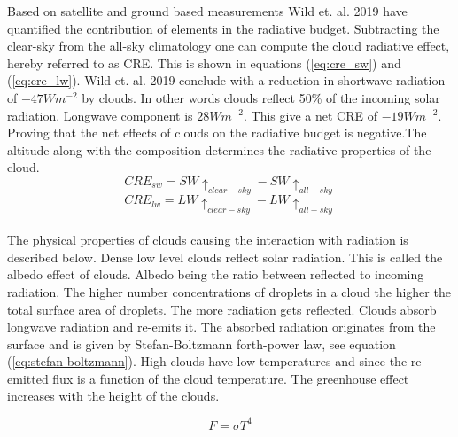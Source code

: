 Based on satellite and ground based measurements Wild et. al. 2019 have quantified the contribution of elements in the radiative budget. Subtracting the clear-sky from the all-sky climatology one can compute the cloud radiative effect, hereby referred to as CRE. This is shown in equations (\ref{eq:cre_sw}) and (\ref{eq:cre_lw}). Wild et. al. 2019 conclude with a reduction in shortwave radiation of $-47Wm^{-2}$ by clouds. In other words clouds reflect 50\% of the incoming solar radiation. Longwave component is $28Wm^{-2}$. This give a net CRE of $-19Wm^{-2}$. Proving that the net effects of clouds on the radiative budget is negative.The altitude along with the composition determines the radiative properties of the cloud.
\begin{equation} \label{eq:cre_sw}
    CRE_{sw} = SW\uparrow_{clear-sky} - SW\uparrow_{all-sky}
\end{equation}
\begin{equation} \label{eq:cre_lw}
    CRE_{lw} = LW\uparrow_{clear-sky} - LW\uparrow_{all-sky}
\end{equation}
\\
The physical properties of clouds causing the interaction with radiation is described below. Dense low level clouds reflect solar radiation. This is called the albedo effect of clouds. Albedo being the ratio between reflected to incoming radiation. The higher number concentrations of droplets in a cloud the higher the total surface area of droplets. The more radiation gets reflected. Clouds absorb longwave radiation and re-emits it. The absorbed radiation originates from the surface and is given by Stefan-Boltzmann forth-power law, see equation (\ref{eq:stefan-boltzmann}). High clouds have low temperatures and since the re-emitted flux is a function of the cloud temperature. The greenhouse effect increases with the height of the clouds.

\begin{equation} \label{eq:stefan-boltzmann}
    F = \sigma T ^4
\end{equation}

